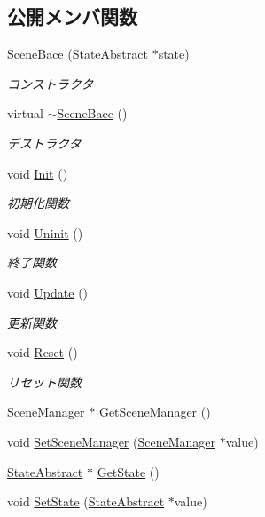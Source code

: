 \subsection*{公開メンバ関数}
\begin{DoxyCompactItemize}
\item 
\mbox{\hyperlink{class_scene_bace_a485fc147477e9feb63688f32d81254aa}{Scene\+Bace}} (\mbox{\hyperlink{class_scene_bace_1_1_state_abstract}{State\+Abstract}} $\ast$state)
\begin{DoxyCompactList}\small\item\em コンストラクタ \end{DoxyCompactList}\item 
virtual \mbox{\hyperlink{class_scene_bace_a99e98adcd3bbae91e12af543a1c6c85b}{$\sim$\+Scene\+Bace}} ()
\begin{DoxyCompactList}\small\item\em デストラクタ \end{DoxyCompactList}\item 
void \mbox{\hyperlink{class_scene_bace_a6e344661a3b5c04b3dfa810f5e1127e4}{Init}} ()
\begin{DoxyCompactList}\small\item\em 初期化関数 \end{DoxyCompactList}\item 
void \mbox{\hyperlink{class_scene_bace_a705bba53d7e7d926e842c909dda38894}{Uninit}} ()
\begin{DoxyCompactList}\small\item\em 終了関数 \end{DoxyCompactList}\item 
void \mbox{\hyperlink{class_scene_bace_a969241f00ad1e5375694634bbf9405fd}{Update}} ()
\begin{DoxyCompactList}\small\item\em 更新関数 \end{DoxyCompactList}\item 
void \mbox{\hyperlink{class_scene_bace_a21b95dfce1c7be78da9d8dfaed56c8d1}{Reset}} ()
\begin{DoxyCompactList}\small\item\em リセット関数 \end{DoxyCompactList}\item 
\mbox{\hyperlink{class_scene_manager}{Scene\+Manager}} $\ast$ \mbox{\hyperlink{class_scene_bace_a8cfd7bba9c0e11ce551dd63b064df8fe}{Get\+Scene\+Manager}} ()
\item 
void \mbox{\hyperlink{class_scene_bace_a6ee6ef2a67b44af5c9082c1759ece37d}{Set\+Scene\+Manager}} (\mbox{\hyperlink{class_scene_manager}{Scene\+Manager}} $\ast$value)
\item 
\mbox{\hyperlink{class_scene_bace_1_1_state_abstract}{State\+Abstract}} $\ast$ \mbox{\hyperlink{class_scene_bace_a40c4a427ff64b30ea6dfd913f2818478}{Get\+State}} ()
\item 
void \mbox{\hyperlink{class_scene_bace_afdec2b31d015629392ada142fe0ce3c7}{Set\+State}} (\mbox{\hyperlink{class_scene_bace_1_1_state_abstract}{State\+Abstract}} $\ast$value)
\end{DoxyCompactItemize}


